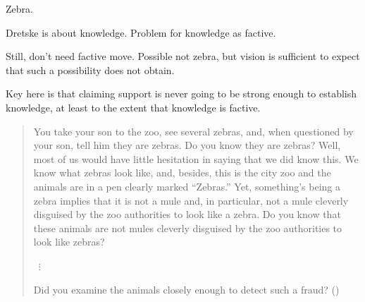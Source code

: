 \begin{note}
  Zebra.

  Dretske is about knowledge.
  Problem for knowledge as factive.

  Still, don't need factive move.
  Possible not zebra, but vision is sufficient to expect that such a possibility does not obtain.

  Key here is that claiming support is never going to be strong enough to establish knowledge, at least to the extent that knowledge is factive.
\end{note}

\begin{note}
  \begin{illustration}
    \label{illu:CS:dretske-zebra}
    \mbox{}
    \vspace{-\baselineskip}
  \begin{quote}
    You take your son to the zoo, see several zebras, and, when questioned by your son, tell him they are zebras.
    Do you know they are zebras?
    Well, most of us would have little hesitation in saying that we did know this.
    We know what zebras look like, and, besides, this is the city zoo and the animals are in a pen clearly marked ``Zebras.''
    Yet, something's being a zebra implies that it is not a mule and, in particular, not a mule cleverly disguised by the zoo authorities to look like a zebra.
    Do you know that these animals are not mules cleverly disguised by the zoo authorities to look like zebras?

    \mbox{ }\hfill \(\vdots\) \hfill\mbox{ }

    Did you examine the animals closely enough to detect such a fraud?\linebreak
    \mbox{}\hfill\mbox{(\citeyear[1015--1016]{Dretske:1970to})}
  \end{quote}
  \vspace{-\baselineskip}
  \end{illustration}
\end{note}

